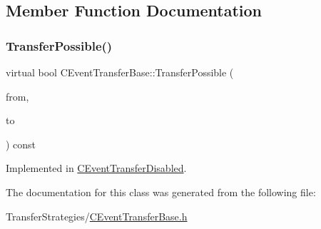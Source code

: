 \subsection{Member Function Documentation}
\mbox{\label{class_c_event_transfer_base_aa72518d8ee05349865216c8e60459669}} 
\subsubsection{\texorpdfstring{Transfer\+Possible()}{TransferPossible()}}
{\footnotesize\ttfamily virtual bool C\+Event\+Transfer\+Base\+::\+Transfer\+Possible (\begin{DoxyParamCaption}\item[{const \mbox{\hyperlink{class_c_date}{C\+Date}} \&}]{from,  }\item[{const \mbox{\hyperlink{class_c_date}{C\+Date}} \&}]{to }\end{DoxyParamCaption}) const\hspace{0.3cm}{\ttfamily [pure virtual]}}



Implemented in \mbox{\hyperlink{class_c_event_transfer_disabled_a5015ce168c3fcba4a20381256f901c3a}{C\+Event\+Transfer\+Disabled}}.



The documentation for this class was generated from the following file\+:\begin{DoxyCompactItemize}
\item 
Transfer\+Strategies/\mbox{\hyperlink{_c_event_transfer_base_8h}{C\+Event\+Transfer\+Base.\+h}}\end{DoxyCompactItemize}
